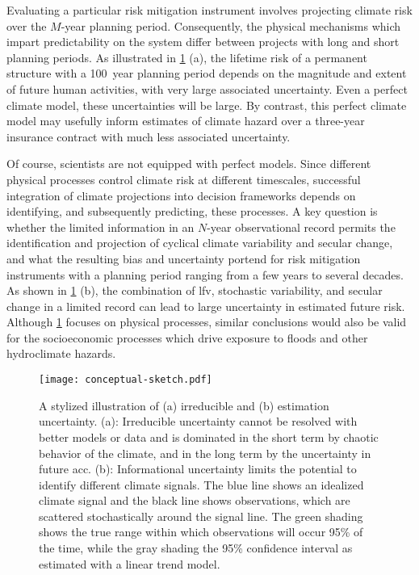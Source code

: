 \documentclass[
  draft,
  linenumbers
]{agujournal2018}
\begin{document}
Evaluating a particular risk mitigation instrument involves projecting climate risk over the $M$-year planning period.
Consequently, the physical mechanisms which impart predictability on the system differ between projects with long and short planning periods.
As illustrated in \cref{fig:conceptual-sketch} (a), the lifetime risk of a permanent structure with a \SI{100}{year} planning period depends on the magnitude and extent of future human activities, with very large associated uncertainty.
Even   a perfect climate model, these uncertainties will be large.
By contrast, this perfect climate model may usefully inform estimates of climate hazard over a three-year insurance contract with much less associated uncertainty.

Of course, scientists are not equipped with perfect models.
Since different physical processes control climate risk at different timescales, successful integration of climate projections into decision frameworks depends on identifying, and subsequently predicting, these processes.
A key question is whether the limited information in an $N$-year observational record permits the identification and projection of cyclical climate variability and secular change, and what the resulting bias and uncertainty portend for risk mitigation instruments with a planning period ranging from a few years to several decades.
As shown in \cref{fig:conceptual-sketch} (b), the combination of \gls{lfv}, stochastic variability, and secular change in a limited record can lead to large uncertainty in estimated future risk.
Although \cref{fig:conceptual-sketch} focuses on physical processes, similar conclusions would also be valid for the socioeconomic processes which drive exposure to floods and other hydroclimate hazards.

\begin{figure}
  \centering
  \texttt{[image: conceptual-sketch.pdf]}
  \caption{
    A stylized illustration of (a) irreducible and (b) estimation uncertainty.
    (a): Irreducible uncertainty cannot be resolved with better models or data and is dominated in the short term by chaotic behavior of the climate, and in the long term by the uncertainty in future \acrlong{acc}.
    (b): Informational uncertainty limits the potential to identify different climate signals.
    The blue line shows an idealized climate signal and the black line shows observations, which are scattered stochastically around the signal line.
    The green shading shows the true range within which observations will occur 95\% of the time, while the gray shading the 95\% confidence interval as estimated with a linear trend model.
    }\label{fig:conceptual-sketch}
\end{figure}
\end{document}
